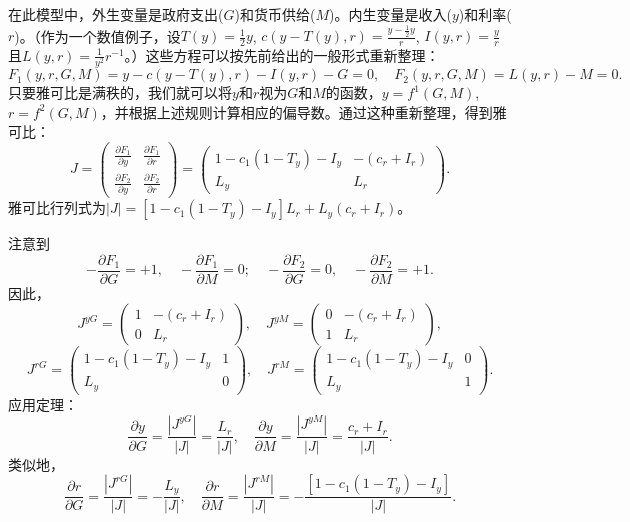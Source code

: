 \begin{translation}
在此模型中，外生变量是政府支出($G$)和货币供给($M$)。内生变量是收入($y$)和利率($r$)。（作为一个数值例子，设$T(y) = \frac{1}{2}y$, $c(y - T(y), r) = \frac{y - \frac{1}{2}y}{r}$, $I(y, r) = \frac{y}{r}$且$L(y, r) = \frac{1}{y^2}r^{-1}$。）这些方程可以按先前给出的一般形式重新整理：
\[
F_1(y, r, G, M) = y - c(y - T(y), r) - I(y, r) - G = 0, \quad F_2(y, r, G, M) = L(y, r) - M = 0.
\]
只要雅可比是满秩的，我们就可以将$y$和$r$视为$G$和$M$的函数，$y = f^1(G, M)$, $r = f^2(G, M)$，并根据上述规则计算相应的偏导数。通过这种重新整理，得到雅可比：
\[
J = \begin{pmatrix}
\frac{\partial F_1}{\partial y} & \frac{\partial F_1}{\partial r} \\[4pt]
\frac{\partial F_2}{\partial y} & \frac{\partial F_2}{\partial r}
\end{pmatrix}
= \begin{pmatrix}
1 - c_1(1 - T_y) - I_y & -(c_r + I_r) \\
L_y & L_r
\end{pmatrix}.
\]
雅可比行列式为$|J| = [1 - c_1(1 - T_y) - I_y]L_r + L_y(c_r + I_r)$。

注意到
\[
-\frac{\partial F_1}{\partial G} = +1, \quad -\frac{\partial F_1}{\partial M} = 0; \quad
-\frac{\partial F_2}{\partial G} = 0, \quad -\frac{\partial F_2}{\partial M} = +1.
\]
因此，
\[
J^{yG} = \begin{pmatrix} 1 & -(c_r + I_r) \\ 0 & L_r \end{pmatrix}, \quad
J^{yM} = \begin{pmatrix} 0 & -(c_r + I_r) \\ 1 & L_r \end{pmatrix},
\]
\[
J^{rG} = \begin{pmatrix} 1 - c_1(1 - T_y) - I_y & 1 \\ L_y & 0 \end{pmatrix}, \quad
J^{rM} = \begin{pmatrix} 1 - c_1(1 - T_y) - I_y & 0 \\ L_y & 1 \end{pmatrix}.
\]
应用定理：
\[
\frac{\partial y}{\partial G} = \frac{|J^{yG}|}{|J|} = \frac{L_r}{|J|}, \quad
\frac{\partial y}{\partial M} = \frac{|J^{yM}|}{|J|} = \frac{c_r + I_r}{|J|}. \tag{7.11}
\]
类似地，
\[
\frac{\partial r}{\partial G} = \frac{|J^{rG}|}{|J|} = -\frac{L_y}{|J|}, \quad
\frac{\partial r}{\partial M} = \frac{|J^{rM}|}{|J|} = -\frac{[1 - c_1(1 - T_y) - I_y]}{|J|}. \tag{7.12}
\]
\end{translation}

